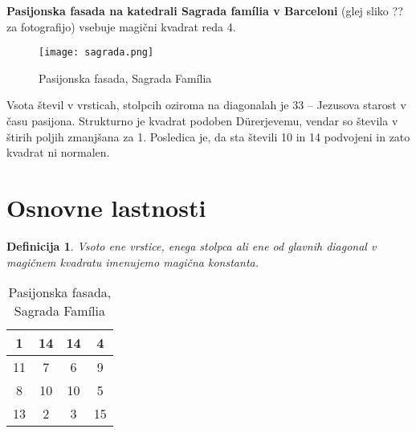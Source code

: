 \documentclass[a4paper,12pt]{article}
\newtheorem{definition}{Definicija}
\begin{document}
\textbf{Pasijonska fasada na katedrali Sagrada família v Barceloni}
(glej sliko ?? za fotografijo) vsebuje magični kvadrat reda 4.
\begin{figure}[!ht]
   \centering
   \caption{Pasijonska fasada, Sagrada Família}
   \label{fig:sagrada}
   \texttt{[image: sagrada.png]}
\end{figure}


Vsota števil v vrsticah, stolpcih oziroma na diagonalah je 33 -- Jezusova starost
v času pasijona. Strukturno je kvadrat podoben Dürerjevemu, vendar so števila
v štirih poljih zmanjšana za 1. Posledica je, da sta števili 10 in 14 podvojeni
in zato kvadrat ni normalen.



\section{Osnovne lastnosti}

\begin{definition}
      Vsoto ene vrstice, enega stolpca ali ene od glavnih diagonal
      v magičnem kvadratu imenujemo \emph{magična konstanta}.
\end{definition}      

\begin{table}[h]
   \centering
   \caption{Pasijonska fasada, Sagrada Família}
   \label{table:sagrada}
   \begin{tabular}{|c|c|c|c|}
      \hline
      1 & 14 & 14 &  4 \\
      \hline
      11 &  7 &  6 &  9 \\
      \hline
      8 & 10 & 10 &  5 \\
      \hline
      13 &  2 &  3 & 15 \\
      \hline
      
   \end{tabular}
   
\end{table}
\end{document}
